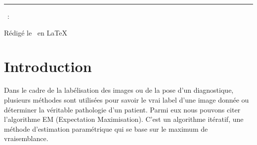 \documentclass[a4paper,french,10pt]{article}
\begin{document}
	
	\title{\vspace{-1in}} %
	\author{} %
	\date{} %
	\maketitle %
	
	\usebox{\myReportTitle}
	\vspace{1in} %
	
	{\centering \huge \assignmentName \par}
	{\centering \noindent\rule{4in}{0.1pt} \par}
	\vspace{0.05in}
	{\centering \courseCode~: \courseName~ \par}
	{\centering Rédigé le \pubDate\ en \LaTeX \par}
	\vspace{1in}
	
	\tableofcontents
	\newpage
	
	
	\section{Introduction}
	
	Dans le cadre de la labélisation des images ou de la pose d'un diagnostique, plusieurs méthodes sont utilisées pour savoir le vrai label d’une image donnée ou déterminer la véritable pathologie d'un patient. Parmi eux nous pouvons citer l’algorithme EM (Expectation Maximisation). C’est un algorithme itératif, une méthode d’estimation paramétrique qui se base sur le maximum de vraisemblance.
	
	
\end{document}
